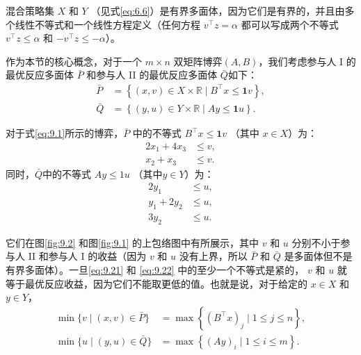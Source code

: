 混合策略集 \(X\) 和 \(Y\) （见式\eqref{eq:6.6}）是有界多面体，因为它们是有界的，并且由多个线性不等式和一个线性方程定义（任何方程 \({v}^{\top }z = \alpha\) 都可以写成两个不等式 \({v}^{\top }z \leq  \alpha\) 和 \(- {v}^{\top }z \leq   - \alpha\)）。


作为本节的核心概念，对于一个 \(m \times  n\) 双矩阵博弈$(A, B)$，我们考虑参与人 I 的最优反应多面体 \(\bar{P}\) 和参与人 II 的最优反应多面体 \(\bar{Q}\)如下：
\begin{equation}
\label{eq:9.20}
\begin{aligned}
\bar{P} 
&= \left\{ (x,v) \in X \times \mathbb{R} \mid B^{\top}x \le \mathbf{1}v \right\}, \\
\bar{Q} 
&= \left\{ (y,u) \in Y \times \mathbb{R} \mid Ay \le \mathbf{1}u \right\}.
\end{aligned}
\end{equation}

对于式\eqref{eq:9.1}所示的博弈，\(\bar{P}\) 中的不等式 \({B}^{\top }x \leq  \mathbf{1}v\) （其中 \(x \in  X\)）为：
\begin{equation}
\label{eq:9.21}
\begin{aligned}
2x_1 + 4x_3 &\le v, \\
x_2 + x_3 &\le v.
\end{aligned}
\end{equation}
同时，\(\bar{Q}\)中的不等式 \({Ay} \leq  {1u}\) （其中\(y \in  Y\)）为：
\begin{equation}
\label{eq:9.22}
\begin{aligned}
2y_1 &\le u, \\
y_1 + 2y_2 &\le u, \\
3y_2 &\le u.
\end{aligned}
\end{equation}

它们在图\ref{fig:9.2} 和图\ref{fig:9.1} 的上包络图中有所展示，其中 \(v\) 和 \(u\) 分别不小于参与人 II 和参与人 I 的收益（因为 \(v\) 和 \(u\) 没有上界，所以 \(\bar{P}\) 和 \(\bar{Q}\) 是多面体但不是有界多面体）。一旦\eqref{eq:9.21}  和 \eqref{eq:9.22} 中的至少一个不等式是紧的， \(v\) 和 \(u\) 就等于最优反应收益，因为它们不能取更低的值。也就是说，对于给定的 \(x \in  X\) 和 \(y \in  Y\)，
\begin{align*}
\min \{ v \mid (x,v) \in \bar{P} \} 
&= \max \left\{ (B^{\top} x)_j \mid 1 \le j \le n \right\}, \\
\min \{ u \mid (y,u) \in \bar{Q} \} 
&= \max \left\{ (Ay)_i \mid 1 \le i \le m \right\}.
\end{align*}

